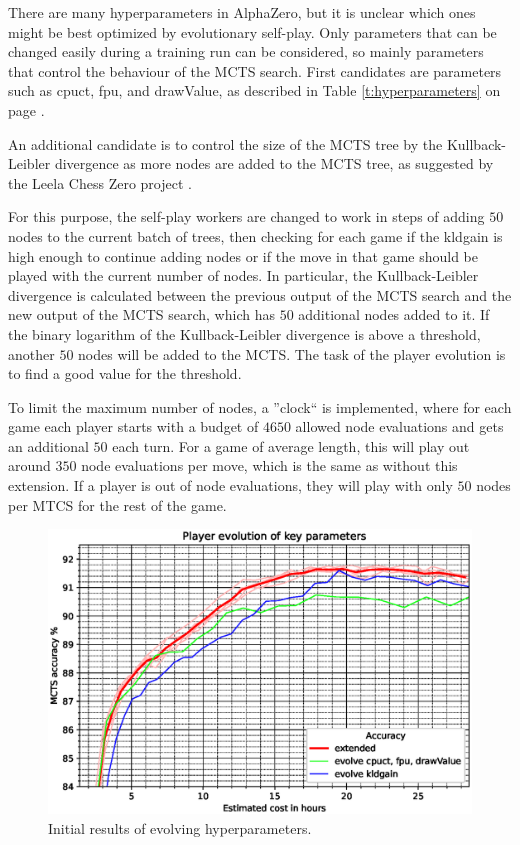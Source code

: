 \documentclass[12pt,onecolumn,oneside,titlepage]{article}
\begin{document}
There are many hyperparameters in AlphaZero, but it is unclear which ones might be best optimized by evolutionary self-play. 
Only parameters that can be changed easily during a training run can be considered, so mainly parameters that control the behaviour of the MCTS search.
First candidates are parameters such as cpuct, fpu, and drawValue, as described in Table \ref{t:hyperparameters} on page \pageref{t:hyperparameters}.

An additional candidate is to control the size of the MCTS tree by the Kullback-Leibler divergence as more nodes are added to the MCTS tree, as suggested by the Leela Chess Zero project \cite{leela0kldgain}. 

For this purpose, the self-play workers are changed to work in steps of adding $50$ nodes to the current batch of trees,
then checking for each game if the kldgain is high enough to continue adding nodes or if the move in that game should be played with the current number of nodes.
In particular, the Kullback-Leibler divergence is calculated between the previous output of the MCTS search and the new output of the MCTS search, which has $50$ additional nodes added to it.
If the binary logarithm of the Kullback-Leibler divergence is above a threshold, another $50$ nodes will be added to the MCTS.
The task of the player evolution is to find a good value for the threshold.

To limit the maximum number of nodes, a ''clock`` is implemented, where for each game each player starts with a budget of $4650$ allowed node evaluations and gets an additional $50$ each turn.
For a game of average length, this will play out around $350$ node evaluations per move,
which is the same as without this extension. If a player is out of node evaluations, they will play with only $50$ nodes per MTCS for the rest of the game.

\begin{figure}[H]
\centering
\includegraphics[clip,width=\columnwidth]{evolve_results}
\caption{Initial results of evolving hyperparameters.}
\label{fig:evolve_results}
\end{figure}
\end{document}
